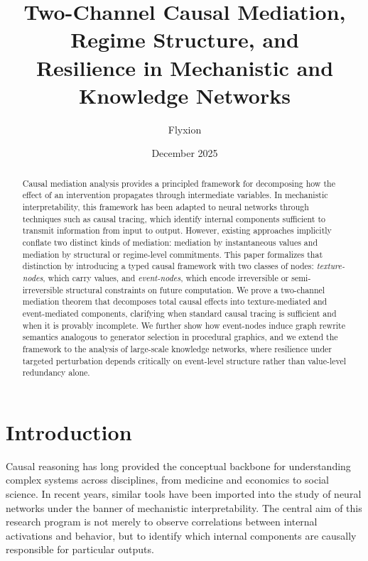 \documentclass[11pt]{article}
\title{Two-Channel Causal Mediation, Regime Structure, and\\
Resilience in Mechanistic and Knowledge Networks}
\author{Flyxion}
\date{December 2025}
\begin{document}
\maketitle

\begin{abstract}
Causal mediation analysis provides a principled framework for decomposing how the effect of an intervention propagates through intermediate variables. In mechanistic interpretability, this framework has been adapted to neural networks through techniques such as causal tracing, which identify internal components sufficient to transmit information from input to output. However, existing approaches implicitly conflate two distinct kinds of mediation: mediation by instantaneous values and mediation by structural or regime-level commitments. This paper formalizes that distinction by introducing a typed causal framework with two classes of nodes: \emph{texture-nodes}, which carry values, and \emph{event-nodes}, which encode irreversible or semi-irreversible structural constraints on future computation. We prove a two-channel mediation theorem that decomposes total causal effects into texture-mediated and event-mediated components, clarifying when standard causal tracing is sufficient and when it is provably incomplete. We further show how event-nodes induce graph rewrite semantics analogous to generator selection in procedural graphics, and we extend the framework to the analysis of large-scale knowledge networks, where resilience under targeted perturbation depends critically on event-level structure rather than value-level redundancy alone.
\end{abstract}

\section{Introduction}

Causal reasoning has long provided the conceptual backbone for understanding complex systems across disciplines, from medicine and economics to social science. In recent years, similar tools have been imported into the study of neural networks under the banner of mechanistic interpretability. The central aim of this research program is not merely to observe correlations between internal activations and behavior, but to identify which internal components are causally responsible for particular outputs.
\end{document}
